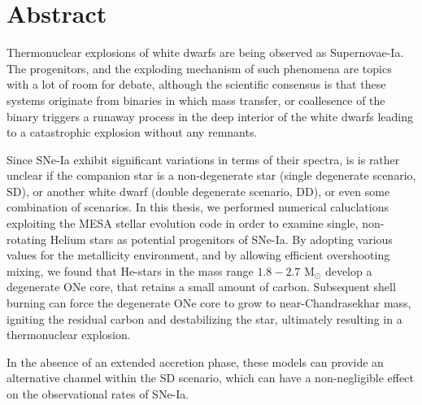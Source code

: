 \documentclass[../main/thesis_msc.tex]{subfiles}
\begin{document}
\chapter*{Abstract}

Thermonuclear explosions of white dwarfs are being observed as Supernovae-Ia. The progenitors, and the exploding mechanism of such phenomena are topics with a lot of room for debate, although the scientific consensus is that these systems originate from binaries in which mass transfer, or coallesence of the binary triggers a runaway process in the deep interior of the white dwarfs leading to a catastrophic explosion without any remnants.

Since SNe-Ia exhibit significant variations in terms of their spectra, is is rather unclear if the companion star is a non-degenerate star (single degenerate scenario, SD), or another white dwarf (double degenerate scenario, DD), or even some combination of scenarios. In this thesis, we performed numerical caluclations exploiting the MESA stellar evolution code in order to examine single, non-rotating Helium stars as potential progenitors of SNe-Ia. By adopting various values for the metallicity environment, and by allowing efficient overshooting mixing, we found that He-stars in the mass range $1.8-2.7$ M$_{\odot}$ develop a degenerate ONe core, that retains a small amount of carbon. Subsequent shell burning can force the degenerate ONe core to grow to near-Chandrasekhar mass, igniting the residual carbon and destabilizing the star, ultimately resulting in a thermonuclear explosion.

In the absence of an extended accretion phase, these models can provide an alternative channel within the SD scenario, which can have a non-negligible effect on the observational rates of SNe-Ia.
\end{document}
